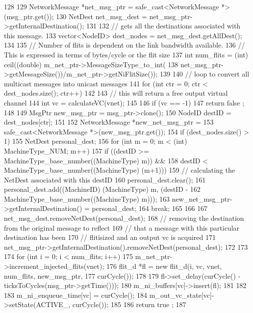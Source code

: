 \begin{DoxyCode}
128 {
129     NetworkMessage *net_msg_ptr = safe_cast<NetworkMessage *>(msg_ptr.get());
130     NetDest net_msg_dest = net_msg_ptr->getInternalDestination();
131 
132     // gets all the destinations associated with this message.
133     vector<NodeID> dest_nodes = net_msg_dest.getAllDest();
134 
135     // Number of flits is dependent on the link bandwidth available.
136     // This is expressed in terms of bytes/cycle or the flit size
137     int num_flits = (int) ceil((double) m_net_ptr->MessageSizeType_to_int(
138         net_msg_ptr->getMessageSize())/m_net_ptr->getNiFlitSize());
139 
140     // loop to convert all multicast messages into unicast messages
141     for (int ctr = 0; ctr < dest_nodes.size(); ctr++) {
142 
143         // this will return a free output virtual channel
144         int vc = calculateVC(vnet);
145 
146         if (vc == -1) {
147             return false ;
148         }
149         MsgPtr new_msg_ptr = msg_ptr->clone();
150         NodeID destID = dest_nodes[ctr];
151 
152         NetworkMessage *new_net_msg_ptr =
153             safe_cast<NetworkMessage *>(new_msg_ptr.get());
154         if (dest_nodes.size() > 1) {
155             NetDest personal_dest;
156             for (int m = 0; m < (int) MachineType_NUM; m++) {
157                 if ((destID >= MachineType_base_number((MachineType) m)) &&
158                     destID < MachineType_base_number((MachineType) (m+1))) {
159                     // calculating the NetDest associated with this destID
160                     personal_dest.clear();
161                     personal_dest.add((MachineID) {(MachineType) m, (destID -
162                         MachineType_base_number((MachineType) m))});
163                     new_net_msg_ptr->getInternalDestination() = personal_dest;
164                     break;
165                 }
166             }
167             net_msg_dest.removeNetDest(personal_dest);
168             // removing the destination from the original message to reflect
169             // that a message with this particular destination has been
170             // flitisized and an output vc is acquired
171             net_msg_ptr->getInternalDestination().removeNetDest(personal_dest);
172         }
173 
174         for (int i = 0; i < num_flits; i++) {
175             m_net_ptr->increment_injected_flits(vnet);
176             flit_d *fl = new flit_d(i, vc, vnet, num_flits, new_msg_ptr,
177                 curCycle());
178 
179             fl->set_delay(curCycle() - ticksToCycles(msg_ptr->getTime()));
180             m_ni_buffers[vc]->insert(fl);
181         }
182 
183         m_ni_enqueue_time[vc] = curCycle();
184         m_out_vc_state[vc]->setState(ACTIVE_, curCycle());
185     }
186     return true ;
187 }
\end{DoxyCode}
